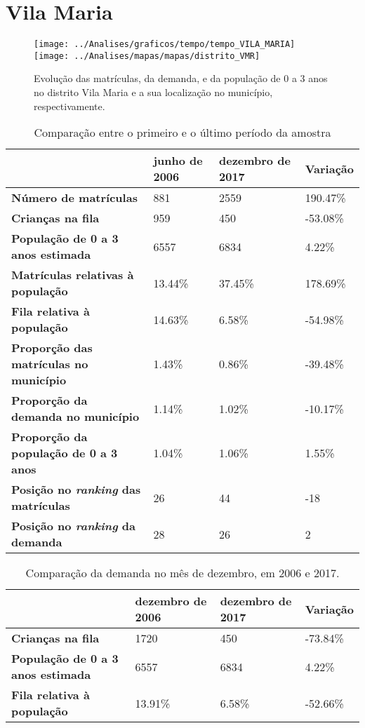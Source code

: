 \section{Vila Maria}
\begin{figure}[H]
	\centering
	\texttt{[image: ../Analises/graficos/tempo/tempo\_VILA\_MARIA]}
	\texttt{[image: ../Analises/mapas/mapas/distrito\_VMR]}
	\caption{Evolução das matrículas, da demanda, e da população de 0 a 3 anos no distrito Vila Maria e a sua localização no município, respectivamente.}
\end{figure}
\begin{table}[H]
	\begin{tabular}{|l|l|l|l|}
		\hline
		\textbf{}                                      & \textbf{junho de 2006}       & \textbf{dezembro de 2017}    & \textbf{Variação} \\ \hline
		\textbf{Número de matrículas}                  & 881 & 2559 & 190.47\% \\ \hline
		\textbf{Crianças na fila}                      & 959 & 450 & -53.08\% \\ \hline
		\textbf{População de 0 a 3 anos estimada}      & 6557 & 6834 & 4.22\% \\ \hline
		\textbf{Matrículas relativas à população}      & 13.44\% & 37.45\% & 178.69\% \\ \hline
		\textbf{Fila relativa à população}             & 14.63\% & 6.58\% & -54.98\% \\ \hline
		\textbf{Proporção das matrículas no município} & 1.43\% & 0.86\% & -39.48\% \\ \hline
		\textbf{Proporção da demanda no município}     & 1.14\% & 1.02\% & -10.17\% \\ \hline
		\textbf{Proporção da população de 0 a 3 anos}  & 1.04\% & 1.06\% & 1.55\% \\ \hline
		\textbf{Posição no \textit{ranking} das matrículas}     & 26 & 44 & -18 \\ \hline
		\textbf{Posição no \textit{ranking} da demanda}         & 28 & 26 & 2 \\ \hline
	\end{tabular}
	\caption{Comparação entre o primeiro e o último período da amostra}
\end{table}
\begin{table}[H]
	\begin{tabular}{|l|l|l|l|}
		\hline
		\textbf{}                                 & \textbf{dezembro de 2006} & \textbf{dezembro de 2017} & \textbf{Variação} \\ \hline
		\textbf{Crianças na fila}                      & 1720 & 450 & -73.84\% \\ \hline
		\textbf{População de 0 a 3 anos estimada}      & 6557 & 6834 & 4.22\% \\ \hline
		\textbf{Fila relativa à população}             & 13.91\% & 6.58\% & -52.66\% \\ \hline
	\end{tabular}
	\caption{Comparação da demanda no mês de dezembro, em 2006 e 2017.}
\end{table}
